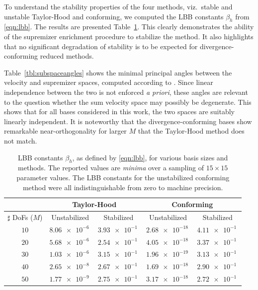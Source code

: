 \documentclass[onecolumn, twoside, a4paper, 11pt]{article}
\begin{document}
To understand the stability properties of the four methods, viz.~stable and unstable Taylor-Hood and
conforming, we computed the LBB constants $\beta_h$ from \eqref{eqn:lbb}. The results are presented
Table~\ref{tbl:lbb}. This clearly demonstrates the ability of the supremizer enrichment procedure to
stabilize the method. It also highlights that no significant degradation of stability is to be
expected for divergence-conforming reduced methods.

Table~\ref{tbl:subspaceangles} shows the minimal principal angles between the velocity and supremizer
spaces, computed according to \cite{Knyazev2002pab}. Since linear independence between the two is
not enforced \emph{a priori}, these angles are relevant to the question whether the sum velocity
space may possibly be degenerate. This shows that for all bases considered in this work, the two
spaces are suitably linearly independent. It is noteworthy that the divergence-conforming bases show
remarkable near-orthogonality for larger $M$ that the Taylor-Hood method does not match.

\begin{table}
  \begin{center}
    \bgroup{}
    \begin{tabular}{crrrr}
      & \multicolumn{2}{c}{\bf Taylor-Hood} & \multicolumn{2}{c}{\bf Conforming} \\
      \hline
      $\sharp$ DoFs ($M$)
      & \multicolumn{1}{c}{Unstabilized} & \multicolumn{1}{c}{Stabilized}
      & \multicolumn{1}{c}{Unstabilized} & \multicolumn{1}{c}{Stabilized} \\
      \hline $10$ & $\SI{8.06e-6}{}$ & $\SI{3.93e-1}{}$ & $\SI{2.68e-18}{}$ & $\SI{4.11e-1}{}$ \\
      $20$ & $\SI{5.68e-6}{}$ & $\SI{2.54e-1}{}$ & $\SI{4.05e-18}{}$ & $\SI{3.37e-1}{}$ \\
      $30$ & $\SI{1.03e-6}{}$ & $\SI{3.15e-1}{}$ & $\SI{1.96e-19}{}$ & $\SI{3.13e-1}{}$ \\
      $40$ & $\SI{2.65e-8}{}$ & $\SI{2.67e-1}{}$ & $\SI{1.69e-18}{}$ & $\SI{2.90e-1}{}$ \\
      $50$ & $\SI{1.77e-9}{}$ & $\SI{2.75e-1}{}$ & $\SI{3.17e-18}{}$ & $\SI{2.72e-1}{}$ \\
      \hline
    \end{tabular}
    \egroup
  \end{center}
  \caption{
    LBB constants $\beta_h$, as defined by \eqref{eqn:lbb}, for various basis
    sizes and methods. The reported values are \emph{minima} over a sampling of
    $15 \times 15$ parameter values. The LBB constants for the unstabilized conforming
    method were all indistinguishable from zero to machine precision.
  }
  \label{tbl:lbb}
\end{table}
\end{document}
